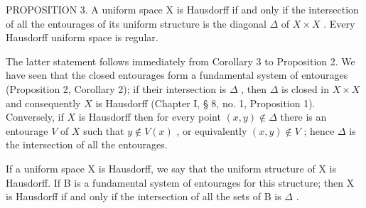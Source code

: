 PROPOSITION 3. A uniform space X is Hausdorff if and only if the intersection of all the entourages of its uniform structure is the diagonal \(\Delta\) of \(X \times X\) . Every Hausdorff uniform space is regular.

The latter statement follows immediately from Corollary 3 to Proposition 2. We have seen that the closed entourages form a fundamental system of entourages (Proposition 2, Corollary 2); if their intersection is \(\Delta\) , then \(\Delta\) is closed in \(X \times X\) and consequently \(X\) is Hausdorff (Chapter I, § 8, no. 1, Proposition 1). Conversely, if \(X\) is Hausdorff then for every point \((x, y) \notin \Delta\) there is an entourage \(V\) of \(X\) such that \(y \notin V(x)\) , or equivalently \((x, y) \notin V\) ; hence \(\Delta\) is the intersection of all the entourages.

If a uniform space X is Hausdorff, we say that the uniform structure of X is Hausdorff. If B is a fundamental system of entourages for this structure; then X is Hausdorff if and only if the intersection of all the sets of B is \(\Delta\) .

